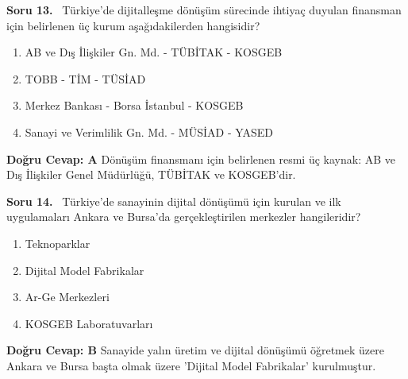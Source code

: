 \documentclass[11pt,a4paper,openany]{book}
\begin{document}
\needspace{5cm}
\vspace{8pt}
\noindent\textbf{\large\sffamily Soru 13.} \ Türkiye'de dijitalleşme dönüşüm sürecinde ihtiyaç duyulan finansman için belirlenen üç kurum aşağıdakilerden hangisidir?
\begin{enumerate}[label=\Alph*), leftmargin=25pt, topsep=4pt, itemsep=2pt]
    \item AB ve Dış İlişkiler Gn. Md. - TÜBİTAK - KOSGEB
    \item TOBB - TİM - TÜSİAD
    \item Merkez Bankası - Borsa İstanbul - KOSGEB
    \item Sanayi ve Verimlilik Gn. Md. - MÜSİAD - YASED
\end{enumerate}
\vspace{4pt}
\begin{tcolorbox}[title=Cevap ve Açıklama, colback=gray!3!white, colframe=primarycolor!90!black, arc=2mm, fonttitle=\bfseries\sffamily, top=6pt, bottom=6pt]
    \textbf{Doğru Cevap: A}
    \vspace{2pt}
    Dönüşüm finansmanı için belirlenen resmi üç kaynak: AB ve Dış İlişkiler Genel Müdürlüğü, TÜBİTAK ve KOSGEB'dir.
\end{tcolorbox}
\vspace{10pt}

\needspace{5cm}
\vspace{8pt}
\noindent\textbf{\large\sffamily Soru 14.} \ Türkiye'de sanayinin dijital dönüşümü için kurulan ve ilk uygulamaları Ankara ve Bursa'da gerçekleştirilen merkezler hangileridir?
\begin{enumerate}[label=\Alph*), leftmargin=25pt, topsep=4pt, itemsep=2pt]
    \item Teknoparklar
    \item Dijital Model Fabrikalar
    \item Ar-Ge Merkezleri
    \item KOSGEB Laboratuvarları
\end{enumerate}
\vspace{4pt}
\begin{tcolorbox}[title=Cevap ve Açıklama, colback=gray!3!white, colframe=primarycolor!90!black, arc=2mm, fonttitle=\bfseries\sffamily, top=6pt, bottom=6pt]
    \textbf{Doğru Cevap: B}
    \vspace{2pt}
    Sanayide yalın üretim ve dijital dönüşümü öğretmek üzere Ankara ve Bursa başta olmak üzere 'Dijital Model Fabrikalar' kurulmuştur.
\end{tcolorbox}
\vspace{10pt}
\end{document}
